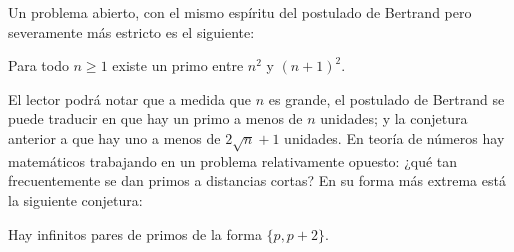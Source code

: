 \documentclass[teoria-numeros.tex]{subfiles}
\begin{document}
Un problema abierto, con el mismo espíritu del postulado de Bertrand pero severamente más estricto es el siguiente:
\begin{con}
	Para todo $n \ge 1$ existe un primo entre $n^2$ y $(n + 1)^2$.
\end{con}
El lector podrá notar que a medida que $n$ es grande, el postulado de Bertrand se puede traducir en que hay un primo a menos de $n$ unidades;
y la conjetura anterior a que hay uno a menos de $2\sqrt{n} + 1$ unidades.
En teoría de números hay matemáticos trabajando en un problema relativamente opuesto: ¿qué tan frecuentemente se dan primos a distancias cortas?
En su forma más extrema está la siguiente conjetura:
\begin{con}
	Hay infinitos pares de primos de la forma $\{ p, p+2 \}$.
\end{con}


\end{document}
